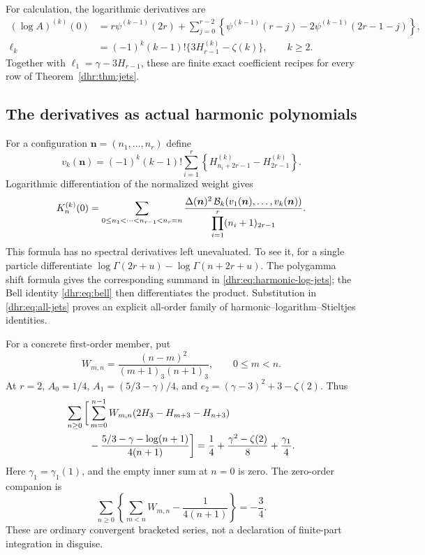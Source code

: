 For calculation, the logarithmic derivatives are
\begin{align}
 (\log A)^{(k)}(0)
 &=r\psi^{(k-1)}(2r)
 +\sum_{j=0}^{r-2}\left\{\psi^{(k-1)}(r-j)
                    -2\psi^{(k-1)}(2r-1-j)\right\},
 \label{dhr:eq:integer-A-jets}\\
 \ell_k&=(-1)^k(k-1)!
       \{3H_{r-1}^{(k)}-\zeta(k)\},\qquad k\geq2.
 \label{dhr:eq:integer-E-jets}
\end{align}
Together with $\ell_1=\gamma-3H_{r-1}$, these are finite exact
coefficient recipes for every row of Theorem~\ref{dhr:thm:jets}.

\subsection{The derivatives as actual harmonic polynomials}
For a configuration $\bm n=(n_1,\ldots,n_r)$ define
\begin{equation}\label{dhr:eq:harmonic-log-jets}
 v_k(\bm n)=(-1)^k(k-1)!
  \sum_{i=1}^r\left\{H_{n_i+2r-1}^{(k)}-H_{2r-1}^{(k)}\right\}.
\end{equation}
Logarithmic differentiation of the normalized weight gives
\begin{equation}\label{dhr:eq:K-harmonic}
 K_n^{(k)}(0)=
 \sum_{0\leq n_1<\cdots<n_{r-1}<n_r=n}
 \frac{\Delta(\bm n)^2\,
  \mathcal B_k(v_1(\bm n),\ldots,v_k(\bm n))}
 {\displaystyle\prod_{i=1}^r(n_i+1)_{2r-1}}.
\end{equation}
This formula has no spectral derivatives left unevaluated. To see it,
for a single particle differentiate
$\log\Gamma(2r+u)-\log\Gamma(n+2r+u)$.
The polygamma shift formula gives the corresponding summand in
\eqref{dhr:eq:harmonic-log-jets}; the Bell identity
\eqref{dhr:eq:bell} then differentiates the product. Substitution in
\eqref{dhr:eq:all-jets} proves an explicit all-order family of
harmonic--logarithm--Stieltjes identities.

For a concrete first-order member, put
\begin{equation}\label{dhr:eq:W2}
 W_{m,n}=\frac{(n-m)^2}{(m+1)_3(n+1)_3},\qquad 0\leq m<n.
\end{equation}
At $r=2$, $A_0=1/4$, $A_1=(5/3-\gamma)/4$, and
$e_2=(\gamma-3)^2+3-\zeta(2)$. Thus
\begin{align}
 \sum_{n\geq0}\bigg[&\sum_{m=0}^{n-1}W_{m,n}
       (2H_3-H_{m+3}-H_{n+3})\notag\\
 &-\frac{5/3-\gamma-\log(n+1)}{4(n+1)}\bigg]
 =\frac14+\frac{\gamma^2-\zeta(2)}8+\frac{\gamma_1}{4}.
 \label{dhr:eq:explicit-stieltjes}
\end{align}
Here $\gamma_1=\gamma_1(1)$, and the empty inner sum at $n=0$ is zero.
The zero-order companion is
\begin{equation}\label{dhr:eq:explicit-stieltjes-zero}
 \sum_{n\geq0}\left\{\sum_{m<n}W_{m,n}-\frac1{4(n+1)}\right\}
 =-\frac34.
\end{equation}
These are ordinary convergent bracketed series, not a declaration of
finite-part integration in disguise.

